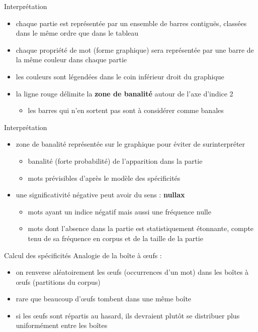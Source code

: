 \documentclass[xetex,xcolor={table,usenames,dvipsnames}]{beamer}
\newcommand{\bolder}[1]{{\color{purple}\bfseries#1}}
\begin{document}
\begin{frame}{Interprétation}
	\begin{itemize}
		\item chaque partie est représentée par un ensemble de barres contiguës, classées dans le
		même ordre que dans le tableau
		\item chaque propriété de mot (forme graphique) sera représentée
		par une barre de la même couleur dans chaque partie
		\item les couleurs sont légendées dans le coin inférieur droit du graphique
		\item la ligne rouge délimite la \bolder{zone de banalité} autour de l'axe d'indice 2 
		\begin{itemize}
			\item les barres qui n'en sortent pas sont à considérer comme banales
		\end{itemize}
		\end{itemize}
\end{frame}
\begin{frame}{Interprétation}
\begin{itemize}
\item zone de banalité représentée sur le graphique pour éviter de surinterpréter
\begin{itemize}
\item banalité (forte probabilité) de l'apparition dans la partie 
\item mots prévisibles d'après le modèle des spécificités
\end{itemize}
\item une significativité négative peut avoir du sens : \bolder{nullax}
\begin{itemize}
	\item mots ayant un indice négatif mais aussi une fréquence nulle
	\item mots dont l’absence dans la partie est statistiquement
	étonnante, compte tenu de sa fréquence en corpus et de la taille de la partie 
\end{itemize}
\end{itemize}
\begin{flushright}
	{\small \citep{pincemin2022semantique}}
\end{flushright}
\end{frame}



\begin{frame}{Calcul des spécificités}
		Analogie de la boîte à \oe{}ufs :
	\begin{itemize}
		\item on renverse aléatoirement les \oe{}ufs (occurrences d'un mot) dans les boîtes à \oe{}ufs (partitions du corpus)
		\item rare que beaucoup d'œufs tombent dans une même boîte
		\item si les œufs sont répartis au hasard, ils devraient plutôt se distribuer plus uniformément entre les boîtes
	\end{itemize}
\end{frame}
\end{document}
